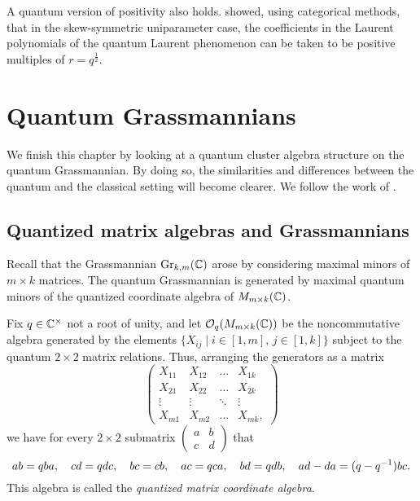 A quantum version of positivity also holds. \Textcite{Davison2018PositivityQuantumCA}
showed, using categorical methods, that in the skew-symmetric uniparameter case, the
coefficients in the Laurent polynomials of the quantum Laurent phenomenon can be taken
to be positive multiples of $r = q^{\frac{1}{2}}$.

\section{Quantum Grassmannians}\label{sec:quantum_grassmannian}

We finish this chapter by looking at a quantum cluster algebra structure on the quantum
Grassmannian. By doing so, the similarities and differences between the quantum and the
classical setting will become clearer. We follow the work of
\textcite{GrabowskiLaunois2011QCAonQuantumGrassmannians}.

\subsection{Quantized matrix algebras and Grassmannians}

Recall that the Grassmannian $\operatorname{Gr}_{k,m}(\mathbb{C})$ arose by considering maximal minors of
$m \times k$ matrices. The quantum Grassmannian is generated by maximal quantum minors
of the quantized coordinate algebra of $M_{m \times k}(\mathbb{C})$.

Fix $q \in \mathbb{C}^\times$ not a root of unity, and let $\mathcal{O}_q(M_{m \times
			k}(\mathbb{C}))$ be the noncommutative algebra
generated by the elements $\{X_{ij} \mid i \in [1,m],\, j \in [1,k] \}$ subject to the
quantum $2\times 2$ matrix relations. Thus, arranging the generators as a matrix
\begin{equation*}
	\begin{pmatrix}
		X_{11} & X_{12} & \dots  & X_{1k}  \\
		X_{21} & X_{22} & \dots  & X_{2k}  \\
		\vdots & \vdots & \ddots & \vdots  \\
		X_{m1} & X_{m2} & \dots  & X_{mk},
	\end{pmatrix}
\end{equation*}
%
we have for every $2 \times 2$ submatrix $\left(\begin{smallmatrix}
			a & b\\
			c & d
		\end{smallmatrix}\right)$ that
\begin{equation*}
	ab =qba, \quad cd = qdc, \quad bc = cb, \quad ac = qca, \quad bd = qdb, \quad ad - da = (q-q^{-1})bc.
\end{equation*}
%
This algebra is called the \emph{quantized matrix coordinate
	algebra}.

